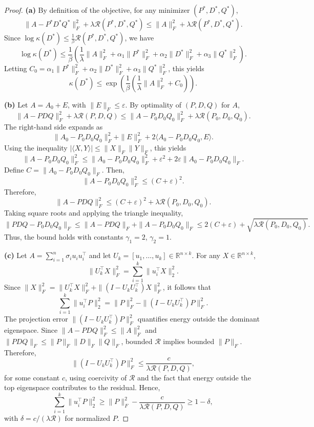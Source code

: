 \documentclass[10pt,a4paper]{article}
\begin{document}
\begin{proof}
\textbf{(a)} By definition of the objective, for any minimizer \( (P^*, D^*, Q^*) \),
\[
\|A - P^* D^* Q^*\|_F^2 + \lambda \mathcal{R}(P^*, D^*, Q^*) \leq \|A\|_F^2 + \lambda \mathcal{R}(P^*, D^*, Q^*).
\]
Since \( \log \kappa(D^*) \leq \frac{1}{\beta} \mathcal{R}(P^*, D^*, Q^*) \), we have
\[
\log \kappa(D^*) \leq \frac{1}{\beta} \left( \frac{1}{\lambda} \|A\|_F^2 + \alpha_1 \|P^*\|_F^2 + \alpha_2 \|D^*\|_F^2 + \alpha_3 \|Q^*\|_F^2 \right).
\]
Letting \( C_0 = \alpha_1 \|P^*\|_F^2 + \alpha_2 \|D^*\|_F^2 + \alpha_3 \|Q^*\|_F^2 \), this yields
\[
\kappa(D^*) \leq \exp\left( \frac{1}{\beta} \left( \frac{1}{\lambda} \|A\|_F^2 + C_0 \right) \right).
\]

\textbf{(b)} Let \( A = A_0 + E \), with \( \|E\|_F \leq \varepsilon \). By optimality of \( (P, D, Q) \) for \( A \),
\[
\|A - P D Q\|_F^2 + \lambda \mathcal{R}(P, D, Q) \leq \|A - P_0 D_0 Q_0\|_F^2 + \lambda \mathcal{R}(P_0, D_0, Q_0).
\]
The right-hand side expands as
\[
\|A_0 - P_0 D_0 Q_0\|_F^2 + \|E\|_F^2 + 2\langle A_0 - P_0 D_0 Q_0, E \rangle.
\]
Using the inequality \( |\langle X, Y \rangle| \leq \|X\|_F \|Y\|_F \), this yields
\[
\|A - P_0 D_0 Q_0\|_F^2 \leq \|A_0 - P_0 D_0 Q_0\|_F^2 + \varepsilon^2 + 2 \varepsilon \|A_0 - P_0 D_0 Q_0\|_F.
\]
Define \( C = \|A_0 - P_0 D_0 Q_0\|_F \). Then,
\[
\|A - P_0 D_0 Q_0\|_F^2 \leq (C + \varepsilon)^2.
\]
Therefore,
\[
\|A - P D Q\|_F^2 \leq (C + \varepsilon)^2 + \lambda \mathcal{R}(P_0, D_0, Q_0).
\]
Taking square roots and applying the triangle inequality,
\[
\|P D Q - P_0 D_0 Q_0\|_F \leq \|A - P D Q\|_F + \|A - P_0 D_0 Q_0\|_F \leq 2(C + \varepsilon) + \sqrt{\lambda \mathcal{R}(P_0, D_0, Q_0)}.
\]
Thus, the bound holds with constants \( \gamma_1 = 2 \), \( \gamma_2 = 1 \).

\textbf{(c)} Let \( A = \sum_{i=1}^n \sigma_i u_i u_i^\top \) and let \( U_k = [u_1, \dots, u_k] \in \mathbb{R}^{n \times k} \). For any \( X \in \mathbb{R}^{n \times k} \),
\[
\|U_k^\top X\|_F^2 = \sum_{i=1}^k \|u_i^\top X\|_2^2.
\]
Since \( \|X\|_F^2 = \|U_k^\top X\|_F^2 + \|(I - U_k U_k^\top) X\|_F^2 \), it follows that
\[
\sum_{i=1}^k \|u_i^\top P\|_2^2 = \|P\|_F^2 - \|(I - U_k U_k^\top) P\|_F^2.
\]
The projection error \( \|(I - U_k U_k^\top) P\|_F^2 \) quantifies energy outside the dominant eigenspace. Since \( \|A - P D Q\|_F^2 \leq \|A\|_F^2 \) and \( \|P D Q\|_F \leq \|P\|_F \|D\|_F \|Q\|_F \), bounded \( \mathcal{R} \) implies bounded \( \|P\|_F \). Therefore,
\[
\|(I - U_k U_k^\top) P\|_F^2 \leq \frac{c}{\lambda \mathcal{R}(P, D, Q)},
\]
for some constant \( c \), using coercivity of \( \mathcal{R} \) and the fact that energy outside the top eigenspace contributes to the residual. Hence,
\[
\sum_{i=1}^k \|u_i^\top P\|_2^2 \geq \|P\|_F^2 - \frac{c}{\lambda \mathcal{R}(P, D, Q)} \geq 1 - \delta,
\]
with \( \delta = c / (\lambda \mathcal{R}) \) for normalized \( P \).
\end{proof}
\end{document}
